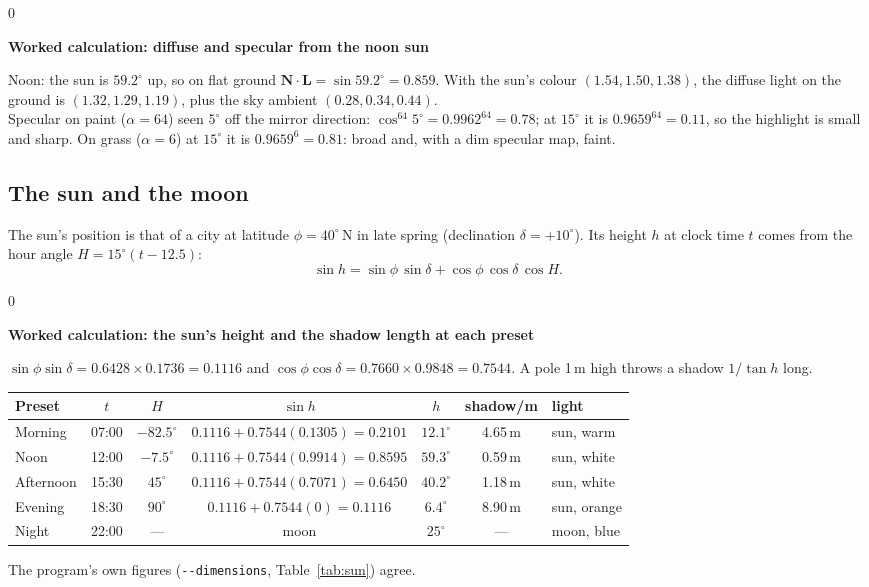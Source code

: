 \documentclass[11pt,a4paper]{article}
\newcommand{\code}[1]{\texttt{\small #1}}
\newenvironment{calc}[1]{\par\smallskip\noindent\begin{minipage}{\textwidth}\setlength{\fboxsep}{6pt}\begin{lrbox}{0}\begin{minipage}{0.955\textwidth}\textbf{Worked calculation: #1}\par\smallskip}{\end{minipage}\end{lrbox}\fbox{\usebox{0}}\end{minipage}\par\smallskip}
\begin{document}
\begin{calc}{diffuse and specular from the noon sun}
Noon: the sun is $59.2^\circ$ up, so on flat ground $\mathbf{N}\cdot\mathbf{L} = \sin 59.2^\circ = 0.859$. With the sun's colour $(1.54, 1.50, 1.38)$, the diffuse light on the ground is $(1.32, 1.29, 1.19)$, plus the sky ambient $(0.28, 0.34, 0.44)$.\\
Specular on paint ($\alpha = 64$) seen $5^\circ$ off the mirror direction: $\cos^{64} 5^\circ = 0.9962^{64} = 0.78$; at $15^\circ$ it is $0.9659^{64} = 0.11$, so the highlight is small and sharp. On grass ($\alpha = 6$) at $15^\circ$ it is $0.9659^6 = 0.81$: broad and, with a dim specular map, faint.
\end{calc}

\subsection{The sun and the moon}
The sun's position is that of a city at latitude $\phi = 40^\circ$\,N in late spring (declination $\delta = +10^\circ$). Its height $h$ at clock time $t$ comes from the hour angle $H = 15^\circ(t - 12.5)$:
\[
\sin h = \sin\phi\,\sin\delta + \cos\phi\,\cos\delta\,\cos H .
\]
\begin{calc}{the sun's height and the shadow length at each preset}
$\sin\phi\sin\delta = 0.6428 \times 0.1736 = 0.1116$ and $\cos\phi\cos\delta = 0.7660\times 0.9848 = 0.7544$. A pole 1\,m high throws a shadow $1/\tan h$ long.
\begin{center}\small\setlength{\tabcolsep}{4pt}
\begin{tabular}{@{}lcccccl@{}}
\toprule
Preset & $t$ & $H$ & $\sin h$ & $h$ & shadow/m & light \\ \midrule
Morning & 07:00 & $-82.5^\circ$ & $0.1116 + 0.7544(0.1305) = 0.2101$ & $12.1^\circ$ & 4.65\,m & sun, warm \\
Noon & 12:00 & $-7.5^\circ$ & $0.1116 + 0.7544(0.9914) = 0.8595$ & $59.3^\circ$ & 0.59\,m & sun, white \\
Afternoon & 15:30 & $45^\circ$ & $0.1116 + 0.7544(0.7071) = 0.6450$ & $40.2^\circ$ & 1.18\,m & sun, white \\
Evening & 18:30 & $90^\circ$ & $0.1116 + 0.7544(0) = 0.1116$ & $6.4^\circ$ & 8.90\,m & sun, orange \\
Night & 22:00 & --- & moon & $25^\circ$ & --- & moon, blue \\
\bottomrule
\end{tabular}
\end{center}
The program's own figures (\code{-{}-dimensions}, Table~\ref{tab:sun}) agree.
\end{calc}
\end{document}
